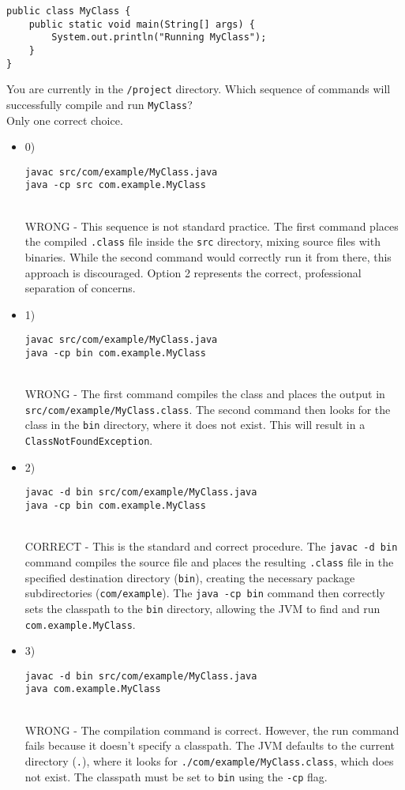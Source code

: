 \documentclass[12pt]{article}
\begin{document}
\begin{enumerate}[label=(\arabic*)]
\begin{verbatim}
public class MyClass {
    public static void main(String[] args) {
        System.out.println("Running MyClass");
    }
}
\end{verbatim}
You are currently in the \verb|/project| directory. Which sequence of commands will successfully compile and run \verb|MyClass|?
\\ \noindent Only one correct choice. 
\begin{itemize}
\item 0) \begin{verbatim}
javac src/com/example/MyClass.java
java -cp src com.example.MyClass
\end{verbatim}
 \\ 
WRONG - This sequence is not standard practice. The first command places the compiled \verb|.class| file inside the \verb|src| directory, mixing source files with binaries. While the second command would correctly run it from there, this approach is discouraged. Option 2 represents the correct, professional separation of concerns.

\item 1) \begin{verbatim}
javac src/com/example/MyClass.java
java -cp bin com.example.MyClass
\end{verbatim}
 \\ 
WRONG - The first command compiles the class and places the output in \verb|src/com/example/MyClass.class|. The second command then looks for the class in the \verb|bin| directory, where it does not exist. This will result in a \verb|ClassNotFoundException|.

\item 2) \begin{verbatim}
javac -d bin src/com/example/MyClass.java
java -cp bin com.example.MyClass
\end{verbatim}
 \\ 
CORRECT - This is the standard and correct procedure. The \verb|javac -d bin| command compiles the source file and places the resulting \verb|.class| file in the specified destination directory (\verb|bin|), creating the necessary package subdirectories (\verb|com/example|). The \verb|java -cp bin| command then correctly sets the classpath to the \verb|bin| directory, allowing the JVM to find and run \verb|com.example.MyClass|.

\item 3) \begin{verbatim}
javac -d bin src/com/example/MyClass.java
java com.example.MyClass
\end{verbatim}
 \\ 
WRONG - The compilation command is correct. However, the run command fails because it doesn't specify a classpath. The JVM defaults to the current directory (\verb|.|), where it looks for \verb|./com/example/MyClass.class|, which does not exist. The classpath must be set to \verb|bin| using the \verb|-cp| flag.


\end{itemize}
\end{enumerate}
\end{document}
